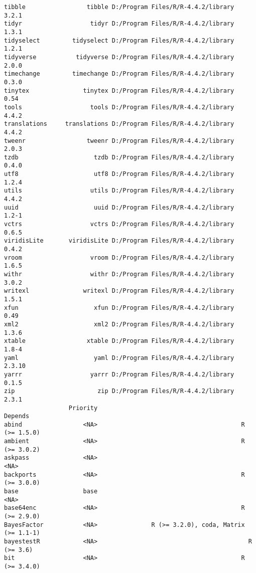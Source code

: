 \documentclass[
  letterpaper,
  DIV=11,
  numbers=noendperiod]{scrreprt}
\begin{document}
\begin{verbatim}
tibble                 tibble D:/Program Files/R/R-4.4.2/library      3.2.1
tidyr                   tidyr D:/Program Files/R/R-4.4.2/library      1.3.1
tidyselect         tidyselect D:/Program Files/R/R-4.4.2/library      1.2.1
tidyverse           tidyverse D:/Program Files/R/R-4.4.2/library      2.0.0
timechange         timechange D:/Program Files/R/R-4.4.2/library      0.3.0
tinytex               tinytex D:/Program Files/R/R-4.4.2/library       0.54
tools                   tools D:/Program Files/R/R-4.4.2/library      4.4.2
translations     translations D:/Program Files/R/R-4.4.2/library      4.4.2
tweenr                 tweenr D:/Program Files/R/R-4.4.2/library      2.0.3
tzdb                     tzdb D:/Program Files/R/R-4.4.2/library      0.4.0
utf8                     utf8 D:/Program Files/R/R-4.4.2/library      1.2.4
utils                   utils D:/Program Files/R/R-4.4.2/library      4.4.2
uuid                     uuid D:/Program Files/R/R-4.4.2/library      1.2-1
vctrs                   vctrs D:/Program Files/R/R-4.4.2/library      0.6.5
viridisLite       viridisLite D:/Program Files/R/R-4.4.2/library      0.4.2
vroom                   vroom D:/Program Files/R/R-4.4.2/library      1.6.5
withr                   withr D:/Program Files/R/R-4.4.2/library      3.0.2
writexl               writexl D:/Program Files/R/R-4.4.2/library      1.5.1
xfun                     xfun D:/Program Files/R/R-4.4.2/library       0.49
xml2                     xml2 D:/Program Files/R/R-4.4.2/library      1.3.6
xtable                 xtable D:/Program Files/R/R-4.4.2/library      1.8-4
yaml                     yaml D:/Program Files/R/R-4.4.2/library     2.3.10
yarrr                   yarrr D:/Program Files/R/R-4.4.2/library      0.1.5
zip                       zip D:/Program Files/R/R-4.4.2/library      2.3.1
                  Priority                                             Depends
abind                 <NA>                                        R (>= 1.5.0)
ambient               <NA>                                        R (>= 3.0.2)
askpass               <NA>                                                <NA>
backports             <NA>                                        R (>= 3.0.0)
base                  base                                                <NA>
base64enc             <NA>                                        R (>= 2.9.0)
BayesFactor           <NA>               R (>= 3.2.0), coda, Matrix (>= 1.1-1)
bayestestR            <NA>                                          R (>= 3.6)
bit                   <NA>                                        R (>= 3.4.0)

\end{verbatim}
\end{document}
